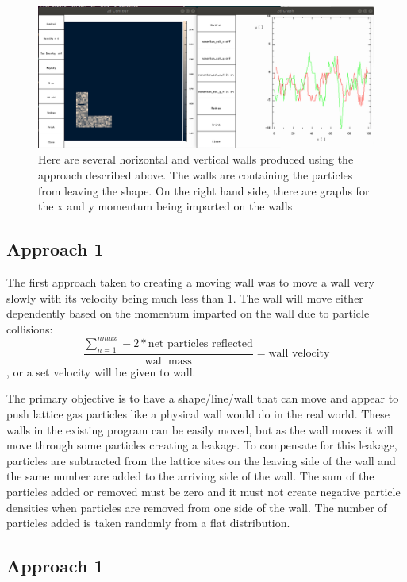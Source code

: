 \documentclass{article}
\begin{document}
\begin{figure}[H]
\includegraphics[scale=0.2]{p1_noleakage.png}
\caption{\label{fig} Here are several horizontal and vertical walls produced using the approach described above. The walls are containing the particles from leaving the shape. On the right hand side, there are graphs for the x and y momentum being imparted on the walls}
\end{figure}

\subsection{Approach 1}

The first approach taken to creating a moving wall was to move a wall very slowly with its velocity being much less than 1. The wall will move either dependently based on the momentum imparted on the wall due to particle collisions: $$\frac{\sum_{n=1}^{nmax} -2*\textrm{net particles reflected}}{\textrm{wall mass}} = \textrm{wall velocity}$$, or a set velocity will be given to wall.



 
The primary objective is to have a shape/line/wall that can move and appear to push lattice gas particles like a physical wall would do in the real world. These walls in the existing program can be easily moved, but as the wall moves it will move through some particles creating a leakage. To compensate for this leakage, particles are subtracted from the lattice sites on the leaving side of the wall and the same number are added to the arriving side of the wall. The sum of the particles added or removed must be zero and it must not create negative particle densities when particles are removed from one side of the wall. The number of particles added is taken randomly from a flat distribution. 

\subsection{Approach 1}
\end{document}
